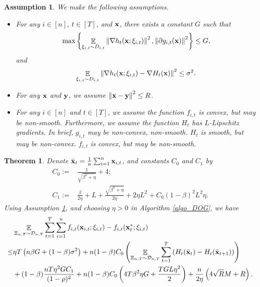 \documentclass{article}
\newtheorem{Theorem}{\bf{Theorem}}
\newtheorem{Assumption}{\bf{Assumption}}
\begin{document}
\begin{Assumption}
\label{assumption_bounded_gradient_domain}
We make the following assumptions.
\begin{itemize}
\item For any $i\in[n]$, $t\in[T]$, and ${\bf x}$, there exists a constant $G$ such that
\begin{align}
\nonumber
\max\left\{ \mathop{\mathbb{E}}_{ \xi_{i,t} \sim D_{i,t} }\left\lVert\nabla h_t({\bf x};\xi_{i,t})\right\rVert^2,  \left\lVert\partial g_{i,t}({\bf x})\right\rVert^2 \right\} \le G,
\end{align} and 
\begin{align}
\nonumber
\mathop{\mathbb{E}}_{ \xi_{i,t} \sim D_{i,t} } \left\lVert\nabla h_t({\bf x}; \xi_{i,t}) - \nabla H_t({\bf x})\right\rVert^2 \le \sigma^2.
\end{align}
\item For any ${\bf x}$ and ${\bf y}$, we assume $\left\lVert{\bf x}-{\bf y}\right\rVert^2 \le R$.
\item {\color{blue} For any $i\in[n]$ and $t\in[T]$, we assume the function $f_{i,t}$ is convex, but may be non-smooth. Furthermore, we assume the function $H_t$ has  $L$-Lipschitz gradients. In brief, $g_{i,t}$ may be non-convex, non-smooth. $H_t$ is smooth, but may be non-convex. $f_{i,t}$ is convex, but may be non-smooth.}
\end{itemize}
\end{Assumption}







\begin{Theorem}
\label{theorem_regret_upper_bound}
Denote $\bar{{\bf x}}_t = \frac{1}{n}\sum_{i=1}^n {\bf x}_{i,t}$, and constants $C_0$ and $C_1$ by
\begin{align}
\nonumber
C_0 := & \frac{1}{\sqrt{\beta^2 + \eta}} + 4; \\ \nonumber
C_1 := & \frac{\beta}{2\eta } +L + \frac{\sqrt{\beta^2 + \eta}}{2\eta} + 2\eta L^2  + C_0 (1-\beta)^2L^2 \eta.
\end{align} Using Assumption \ref{assumption_bounded_gradient_domain}, and choosing $\eta>0$ in Algorithm \ref{algo_DOG}, we have
\begin{align}
\nonumber
& \mathop{\mathbb{E}}_{ \Xi_{n,T} \sim \mathcal{D}_{n,T} } \sum_{t=1}^T\sum_{i=1}^n f_{i,t}({\bf x}_{i,t};\xi_{i,t}) - f_{i,t}({\bf x}_t^\ast;\xi_{i,t}) \\ \nonumber
\le & \eta T \left(  n\beta G + (1-\beta)\sigma^2 \right) + n(1-\beta)C_0 \left(  \mathop{\mathbb{E}}_{ \Xi_{n,T} \sim \mathcal{D}_{n,T} } \sum_{t=1}^T  \left( H_t(\bar{{\bf x}}_t) - H_t(\bar{{\bf x}}_{t+1}) \right)   \right) \\ \nonumber
& + (1-\beta)  \frac{nT\eta^2 G C_1}{(1-\rho)^2}  + n(1-\beta)C_0 \left(  4T\beta^2 \eta G + \frac{TGL\eta^2}{2}  \right)  + \frac{n}{2\eta}\left(  4\sqrt{R}M + R   \right).
\end{align}

\end{Theorem}
\end{document}
